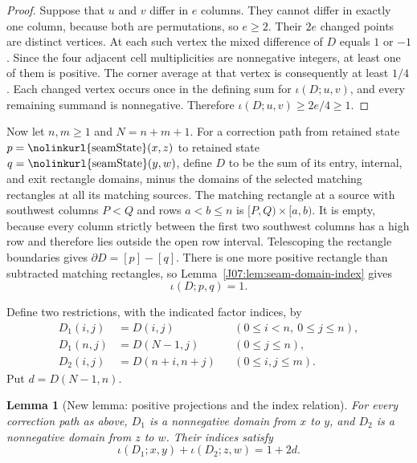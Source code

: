 \documentclass[11pt,oneside]{report}
\newtheorem{lemma}[theorem]{Lemma}
\theoremstyle{definition}
\numberwithin{equation}{section}
\newcommand{\decl}[1]{\textnormal{\nolinkurl{#1}}}
\begin{document}
\begin{proof}
Suppose that $u$ and $v$ differ in $e$ columns.
They cannot differ in exactly one column, because both are permutations,
so $e\ge2$. Their $2e$ changed points are distinct vertices.
At each such vertex the mixed difference of $D$ equals $1$ or $-1$.
Since the four adjacent cell multiplicities are nonnegative integers,
at least one of them is positive. The corner average at that vertex
is consequently at least $1/4$.
Each changed vertex occurs once in the defining sum for
$\iota(D;u,v)$, and every remaining summand is nonnegative.
Therefore $\iota(D;u,v)\ge 2e/4\ge1$.
\end{proof}

Now let $n,m\ge1$ and $N=n+m+1$. For a correction path from retained
state $p=\decl{seamState}(x,z)$ to retained state
$q=\decl{seamState}(y,w)$, define $D$ to be the sum of its entry,
internal, and exit rectangle domains, minus the domains of the selected
matching rectangles at all its matching sources. The matching rectangle
at a source with southwest columns $P<Q$ and rows $a<b\le n$ is
$[P,Q)\times[a,b)$. It is empty, because every column strictly between the first two southwest columns
has a high row and therefore lies outside the open row interval.
Telescoping the rectangle boundaries gives $\partial D=[p]-[q]$.
There is one more positive rectangle than subtracted matching rectangles,
so Lemma~\ref{J07:lem:seam-domain-index} gives
\begin{equation}\label{J07:eq:seam-path-index}
 \iota(D;p,q)=1.
\end{equation}

Define two restrictions, with the indicated factor indices, by
\begin{equation}\label{J07:eq:seam-domain-projections}
 \begin{aligned}
 D_1(i,j)&=D(i,j) &&(0\le i<n,\ 0\le j\le n),\\
 D_1(n,j)&=D(N-1,j) &&(0\le j\le n),\\
 D_2(i,j)&=D(n+i,n+j) &&(0\le i,j\le m).
 \end{aligned}
\end{equation}
Put $d=D(N-1,n)$.

\begin{lemma}[New lemma: positive projections and the index relation]
\label{J07:lem:seam-positive-projections}
For every correction path as above, $D_1$ is a nonnegative domain from
$x$ to $y$, and $D_2$ is a nonnegative domain from $z$ to $w$.
Their indices satisfy
\begin{equation}\label{J07:eq:seam-projected-index}
 \iota(D_1;x,y)+\iota(D_2;z,w)=1+2d.
\end{equation}
\end{lemma}
\end{document}
